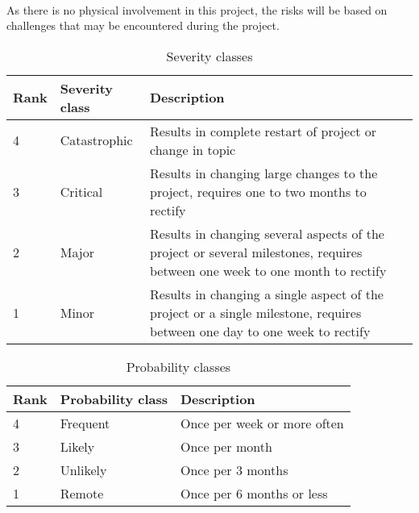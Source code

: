 \paragraph{} As there is no physical involvement in this project, the risks will be based on challenges that may be encountered during the project.

\begin{table}[H]
  \centering
  \caption{Severity classes}
  \begin{tabular}{|p{1cm}|p{2.5cm}|p{10cm}|} \hline
    \bf Rank & \bf Severity class & \bf Description                                                                                                             \\ \hline
    4        & Catastrophic       & Results in complete restart of project or change in topic                                                                   \\ \hline
    3        & Critical           & Results in changing large changes to the project, requires one to two months to rectify                                     \\ \hline
    2        & Major              & Results in changing several aspects of the project or several milestones, requires between one week to one month to rectify \\ \hline
    1        & Minor              & Results in changing a single aspect of the project or a single milestone, requires between one day to one week to rectify   \\ \hline
  \end{tabular}
\end{table}

\begin{table}[H]
  \centering
  \caption{Probability classes}
  \begin{tabular}{|p{1cm}|p{2.5cm}|p{10cm}|} \hline
    \bf Rank & \bf Probability class & \bf Description             \\ \hline
    4        & Frequent              & Once per week or more often \\ \hline
    3        & Likely                & Once per month              \\ \hline
    2        & Unlikely              & Once per 3 months           \\ \hline
    1        & Remote                & Once per 6 months or less   \\ \hline
  \end{tabular}
\end{table}

